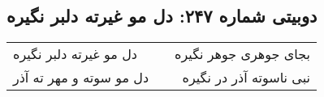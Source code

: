 \begin{center}
\section*{دوبیتی شماره ۲۴۷: دل مو غیرته دلبر نگیره}
\label{sec:247}
\begin{longtable}{l p{0.5cm} r}
دل مو غیرته دلبر نگیره
&&
بجای جوهری جوهر نگیره
\\
دل مو سوته و مهر ته آذر
&&
نبی ناسوته آذر در نگیره
\\
\end{longtable}
\end{center}
